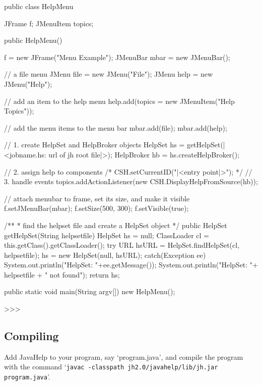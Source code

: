 public class HelpMenu {
   JFrame f;
   JMenuItem topics;

   public HelpMenu() {
     f = new JFrame("Menu Example");
     JMenuBar mbar = new JMenuBar();
     
     // a file menu
     JMenu file = new JMenu("File");
     JMenu help = new JMenu("Help");

     // add an item to the help menu
     help.add(topics = new JMenuItem("Help Topics"));

     // add the menu items to the menu bar
     mbar.add(file);
     mbar.add(help);

     // 1. create HelpSet and HelpBroker objects
     HelpSet hs = getHelpSet(|<jobname.hs: url of jh root file|>); 
     HelpBroker hb = hs.createHelpBroker();

     // 2. assign help to components
/* 
     CSH.setCurrentID("|<entry point|>");
*/     
     // 3. handle events
     topics.addActionListener(new CSH.DisplayHelpFromSource(hb));

     // attach menubar to frame, set its size, and make it visible
     f.setJMenuBar(mbar);
     f.setSize(500, 300);
     f.setVisible(true);
   }

   /**
    * find the helpset file and create a HelpSet object
    */
   public HelpSet getHelpSet(String helpsetfile) {
      HelpSet hs = null;
      ClassLoader cl = this.getClass().getClassLoader();
      try {
        URL hsURL = HelpSet.findHelpSet(cl, helpsetfile);
        hs = new HelpSet(null, hsURL);
      } catch(Exception ee) {
        System.out.println("HelpSet: "+ee.getMessage());
        System.out.println("HelpSet: "+ helpsetfile + " not found");
      }
      return hs;
   }

   public static void main(String argv[]) {
      new HelpMenu();
   }
}
>>>









\subsection{Compiling}

\def\JAVAC{javac -classpath \JHDIR jh2.0/javahelp/lib/jh.jar program.java}

Add JavaHelp to your program, say `program.java', and compile the
program with the command `{\tt \JAVAC}'.



